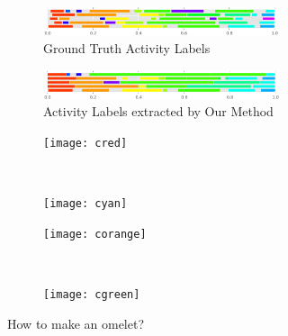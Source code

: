 \begin{figure}
  \begin{subfigure}[b]{0.47\textwidth}
    \begin{subfigure}[b]{\textwidth}
      \includegraphics[width=\textwidth]{act_gt_2}
      \caption*{Ground Truth Activity Labels}
    \end{subfigure}
    \begin{subfigure}[b]{\textwidth}
      \includegraphics[width=\textwidth]{act_our_2}
      \caption*{Activity Labels extracted by Our Method}
    \end{subfigure}
    \begin{subfigure}[b]{0.5\textwidth}
      \texttt{[image: cred]}
      \color[HTML]{FF3800}{Crack the eggs one at a time into a bowl.}
    \end{subfigure}~
    \begin{subfigure}[b]{0.5\textwidth}
      \texttt{[image: cyan]}
      \color[HTML]{00FFED}{Remove the omelet onto a plate.}
    \end{subfigure}
    \begin{subfigure}[b]{0.5\textwidth}
      \texttt{[image: corange]}
      \color[HTML]{FF9900}{You can either use a fork or wire whisk to beat the eggs into a bowl.}
    \end{subfigure}~
    \begin{subfigure}[b]{0.5\textwidth}
      \texttt{[image: cgreen]}
      \color[HTML]{9DFF00}{Eggs cook quickly, so make sure the pan gets very hot first; the butter melt completely.}
    \end{subfigure}
    \caption{How to make an omelet?}
    \label{recipe:ommelette}
  \end{subfigure}\quad\quad\begin{subfigure}[b]{0.47\textwidth}
  

\end{subfigure}
\end{figure}
